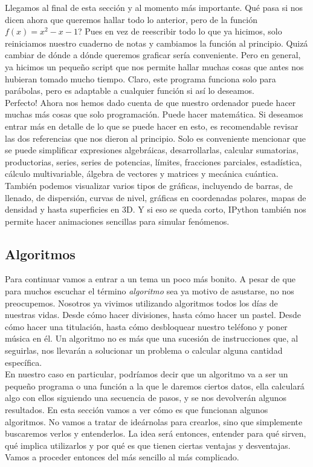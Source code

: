 \documentclass[10pt,letterpaper]{article}
\begin{document}
Llegamos al final de esta secci\'on y al momento m\'as importante. Qu\'e pasa si nos dicen ahora que queremos hallar todo lo anterior, pero de la funci\'on $f(x) = x^2 - x - 1$? Pues en vez de reescribir todo lo que ya hicimos, solo reiniciamos nuestro cuaderno de notas y cambiamos la funci\'on al principio. Quiz\'a cambiar de d\'onde a d\'onde queremos graficar ser\'ia conveniente. Pero en general, ya hicimos un peque\~no script que nos permite hallar muchas cosas que antes nos hubieran tomado mucho tiempo. Claro, este programa funciona solo para par\'abolas, pero es adaptable a cualquier funci\'on si as\'i lo deseamos.\\

Perfecto! Ahora nos hemos dado cuenta de que nuestro ordenador puede hacer muchas m\'as cosas que solo programaci\'on. Puede hacer matem\'atica. Si deseamos entrar m\'as en detalle de lo que se puede hacer en esto, es recomendable revisar las dos referencias que nos dieron al principio. Solo es conveniente mencionar que se puede simplificar expresiones algebr\'aicas, desarrollarlas, calcular sumatorias, productorias, series, series de potencias, l\'imites, fracciones parciales, estad\'istica, c\'alculo multivariable, \'algebra de vectores y matrices y mec\'anica cu\'antica. Tambi\'en podemos visualizar varios tipos de gr\'aficas, incluyendo de barras, de llenado, de dispersi\'on, curvas de nivel, gr\'aficas en coordenadas polares, mapas de densidad y hasta superficies en 3D. Y si eso se queda corto, IPython tambi\'en nos permite hacer animaciones sencillas para simular fen\'omenos.

\subsection{Algoritmos}
Para continuar vamos a entrar a un tema un poco m\'as bonito. A pesar de que para muchos escuchar el t\'ermino \emph{algoritmo} sea ya motivo de asustarse, no nos preocupemos. Nosotros ya vivimos utilizando algoritmos todos los d\'ias de nuestras vidas. Desde c\'omo hacer divisiones, hasta c\'omo hacer un pastel. Desde c\'omo hacer una titulaci\'on, hasta c\'omo desbloquear nuestro tel\'efono y poner m\'usica en \'el. Un algoritmo no es m\'as que una sucesi\'on de instrucciones que, al seguirlas, nos llevar\'an a solucionar un problema o calcular alguna cantidad espec\'ifica.\\

En nuestro caso en particular, podr\'iamos decir que un algoritmo va a ser un peque\~no programa o una funci\'on a la que le daremos ciertos datos, ella calcular\'a algo con ellos siguiendo una secuencia de pasos, y se nos devolver\'an algunos resultados. En esta secci\'on vamos a ver c\'omo es que funcionan algunos algoritmos. No vamos a tratar de ide\'arnolas para crearlos, sino que simplemente buscaremos verlos y entenderlos. La idea ser\'a entonces, entender para qu\'e sirven, qu\'e implica utilizarlos y por qu\'e es que tienen ciertas ventajas y desventajas. Vamos a proceder entonces del m\'as sencillo al m\'as complicado.
\end{document}
